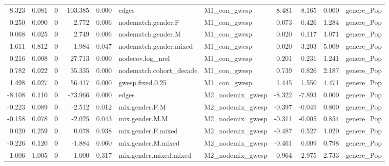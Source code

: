 \begin{table}
\begin{tabular}{rrrrrllrrrl}
   -8.323 & 0.081 &        0 & -103.385 &     0.000 &                   edges &     M1\_con\_gwesp &  -8.481 &  -8.165 &   0.000 &                  genere\_Pop \\
    0.250 & 0.090 &        0 &    2.772 &     0.006 &      nodematch.gender.F &     M1\_con\_gwesp &   0.073 &   0.426 &   1.284 &                  genere\_Pop \\
    0.068 & 0.025 &        0 &    2.749 &     0.006 &      nodematch.gender.M &     M1\_con\_gwesp &   0.020 &   0.117 &   1.071 &                  genere\_Pop \\
    1.611 & 0.812 &        0 &    1.984 &     0.047 &  nodematch.gender.mixed &     M1\_con\_gwesp &   0.020 &   3.203 &   5.009 &                  genere\_Pop \\
    0.216 & 0.008 &        0 &   27.713 &     0.000 &        nodecov.log\_nrel &     M1\_con\_gwesp &   0.201 &   0.231 &   1.241 &                  genere\_Pop \\
    0.782 & 0.022 &        0 &   35.335 &     0.000 & nodematch.cohort\_decade &     M1\_con\_gwesp &   0.739 &   0.826 &   2.187 &                  genere\_Pop \\
    1.498 & 0.027 &        0 &   56.417 &     0.000 &        gwesp.fixed.0.25 &     M1\_con\_gwesp &   1.445 &   1.550 &   4.471 &                  genere\_Pop \\
   -8.108 & 0.110 &        0 &  -73.966 &     0.000 &                   edges & M2\_nodemix\_gwesp &  -8.322 &  -7.893 &   0.000 &                  genere\_Pop \\
   -0.223 & 0.089 &        0 &   -2.512 &     0.012 &          mix.gender.F.M & M2\_nodemix\_gwesp &  -0.397 &  -0.049 &   0.800 &                  genere\_Pop \\
   -0.158 & 0.078 &        0 &   -2.025 &     0.043 &          mix.gender.M.M & M2\_nodemix\_gwesp &  -0.311 &  -0.005 &   0.854 &                  genere\_Pop \\
    0.020 & 0.259 &        0 &    0.078 &     0.938 &      mix.gender.F.mixed & M2\_nodemix\_gwesp &  -0.487 &   0.527 &   1.020 &                  genere\_Pop \\
   -0.226 & 0.120 &        0 &   -1.884 &     0.060 &      mix.gender.M.mixed & M2\_nodemix\_gwesp &  -0.461 &   0.009 &   0.798 &                  genere\_Pop \\
    1.006 & 1.005 &        0 &    1.000 &     0.317 &  mix.gender.mixed.mixed & M2\_nodemix\_gwesp &  -0.964 &   2.975 &   2.733 &                  genere\_Pop \\

\end{tabular}
\end{table}
